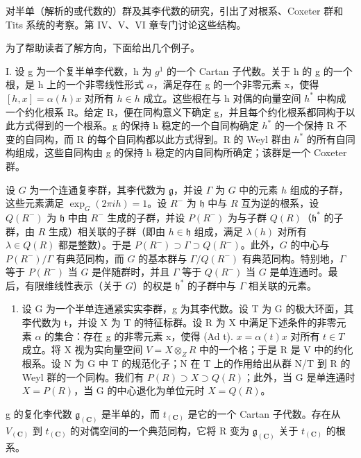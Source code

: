 
对半单（解析的或代数的）群及其李代数的研究，引出了对根系、Coxeter 群和 Tits 系统的考察。第 IV、V、VI 章专门讨论这些结构。

为了帮助读者了解方向，下面给出几个例子。

I. 设 g 为一个复半单李代数，h 为 \(g^{1}\) 的一个 Cartan 子代数。关于 h 的 g 的一个根，是 h 上的一个非零线性形式 \(\alpha\)，满足存在 g 的一个非零元素 x，使得 \([h, x] = \alpha(h)x\) 对所有 \(h \in h\) 成立。这些根在与 h 对偶的向量空间 \(h^{*}\) 中构成一个约化根系 R。给定 R，便在同构意义下确定 g，并且每个约化根系都同构于以此方式得到的一个根系。g 的保持 h 稳定的一个自同构确定 \(h^{*}\) 的一个保持 R 不变的自同构，而 R 的每个自同构都以此方式得到。R 的 Weyl 群由 \(h^{*}\) 的所有自同构组成，这些自同构由 g 的保持 h 稳定的内自同构所确定；该群是一个 Coxeter 群。

设 \(G\) 为一个连通复李群，其李代数为 \(\mathfrak{g}\)，并设 \(\Gamma\) 为 \(G\) 中的元素 \(h\) 组成的子群，这些元素满足 \(\exp_G(2\pi ih) = 1\)。设 \(R^-\) 为 \(\mathfrak{h}\) 中与 \(R\) 互为逆的根系，设 \(Q(R^-)\) 为 \(\mathfrak{h}\) 中由 \(R^-\) 生成的子群，并设 \(P(R^-)\) 为与子群 \(Q(R)\)（\(\mathfrak{h}^*\) 的子群，由 \(R\) 生成）相关联的子群（即由 \(h \in \mathfrak{h}\) 组成，满足 \(\lambda(h)\) 对所有 \(\lambda \in Q(R)\) 都是整数）。于是 \(P(R^-) \supset \Gamma \supset Q(R^-)\)。此外，\(G\) 的中心与 \(P(R^-)/\Gamma\) 有典范同构，而 \(G\) 的基本群与 \(\Gamma/Q(R^-)\) 有典范同构。特别地，\(\Gamma\) 等于 \(P(R^-)\) 当 \(G\) 是伴随群时，并且 \(\Gamma\) 等于 \(Q(R^-)\) 当 \(G\) 是单连通时。最后，有限维线性表示（关于 \(G\)）的权是 \(\mathfrak{h}^*\) 的子群中与 \(\Gamma\) 相关联的元素。

\begin{enumerate}
\def\labelenumi{\Roman{enumi}.}
\setcounter{enumi}{1}
\tightlist
\item
  设 G 为一个半单连通紧实实李群，g 为其李代数。设 T 为 G 的极大环面，其李代数为 t，并设 X 为 T 的特征标群。设 R 为 X 中满足下述条件的非零元素 \(\alpha\) 的集合：存在 g 的非零元素 x，使得 (Ad t). \(x = \alpha(t)x\) 对所有 \(t \in T\) 成立。将 X 视为实向量空间 \(V = X \otimes_{Z} R\) 中的一个格；于是 R 是 V 中的约化根系。设 N 为 G 中 T 的规范化子；N 在 T 上的作用给出从群 N/T 到 R 的 Weyl 群的一个同构。我们有 \(P(R) \supset X \supset Q(R)\)；此外，当 G 是单连通时 \(X = P(R)\)，当 G 的中心退化为单位元时 \(X = Q(R)\)。
\end{enumerate}

g 的复化李代数 \(\mathfrak{g}_{(\mathbf{C})}\) 是半单的，而 \(t_{(\mathbf{C})}\) 是它的一个 Cartan 子代数。存在从 \(V_{(\mathbf{C})}\) 到 \(t_{(\mathbf{C})}\) 的对偶空间的一个典范同构，它将 R 变为 \(\mathfrak{g}_{(\mathbf{C})}\) 关于 \(t_{(\mathbf{C})}\) 的根系。


